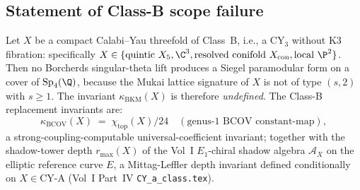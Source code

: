 \subsection*{Statement of Class-B scope failure}

\begin{proposition}\label{prop:agent14-class-b-scope}
Let $X$ be a compact Calabi--Yau threefold of Class~B, i.e., a
CY$_3$ without K3 fibration: specifically $X \in
\{\text{quintic } X_5, \C^3, \text{resolved conifold }
X_{\mathrm{con}}, \text{local } \P^2\}$. Then no Borcherds
singular-theta lift produces a Siegel paramodular form on a
cover of $\mathrm{Sp}_4(\Q)$, because the Mukai lattice
signature of $X$ is not of type $(s, 2)$ with $s \geq 1$. The
invariant $\kappa_{\mathrm{BKM}}(X)$ is therefore
\emph{undefined}. The Class-B replacement invariants are:
\[
  \kappa_{\mathrm{BCOV}}(X) \;=\; \chi_{\mathrm{top}}(X)/24
    \quad (\text{genus-}1\text{ BCOV constant-map}),
\]
a strong-coupling-computable universal-coefficient invariant;
together with the shadow-tower depth $r_{\max}(X)$ of the
Vol~I $E_1$-chiral shadow algebra
$\mathcal{A}_X$ on the elliptic reference curve $E$, a
Mittag-Leffler depth invariant defined conditionally on $X \in
\mathrm{CY\text{-}A}$ (Vol~I Part~IV
\texttt{CY\_a\_class.tex}).
\end{proposition}

